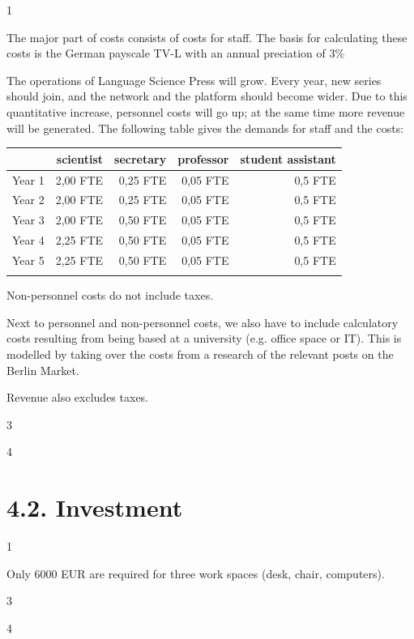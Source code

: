 \documentclass[output=guidelines,draftmode]{langscibook}
\newcommand{\background}[1]{ 
  \vspace{5mm}
  \renewcommand{\tblslinecolour}{lsDarkBlue}
  \tblssy[red]{explore2}{Background}{#1}
}
\newcommand{\langscisolution}[1]{
  \renewcommand{\tblslinecolour}{lsLightBlue}
  \tblssy{langsci}{LangSci solution}{#1}
}
\newcommand{\evaluation}[1]{
  \renewcommand{\tblslinecolour}{lsLightOrange}
  \tblssy{receipt}{Evaluation}{#1}
}
\newcommand{\othersolutions}[1]{
  \renewcommand{\tblslinecolour}{lsDarkGreenOne}
  \tblssy{more}{Other solutions}{#1}
}
\renewcommand{\tblssy}[4][black!12]{%
  \renewcommand{\langscisymbol}{#2}\renewcommand{\tblsboxcolor}{#1}
  \begin{mdframed}[style=yellowexercise,frametitle={#3}]
    #4
  \end{mdframed}
}
\begin{document}
\background{1}
\langscisolution{
The major part of costs consists of costs for staff. The basis for calculating these costs is the German payscale TV-L with an annual preciation of 3\%

The operations of Language Science Press will grow. Every year, new series should join, and the network and the platform should become wider. Due to this quantitative increase, personnel costs will go up; at the same time more revenue will be generated. The following table gives the demands for staff and the costs: 

\noindent
\begin{tabularx}{\textwidth}{Xrrrr}
\lsptoprule
         &  scientist  & secretary &   professor &   student assistant  \\
\midrule
Year 1 &  2,00 FTE                 &    0,25 FTE                       &   0,05 FTE    &   0,5 FTE                  \\
Year 2 &  2,00 FTE                 &    0,25 FTE                       &   0,05 FTE    &   0,5 FTE                  \\
Year 3 &  2,00 FTE                 &    0,50 FTE                        &   0,05 FTE    &   0,5 FTE                  \\
Year 4 &  2,25 FTE              &    0,50 FTE                        &   0,05 FTE    &   0,5 FTE                  \\
Year 5 &  2,25 FTE              &    0,50 FTE                        &   0,05 FTE    &   0,5 FTE                  \\
\lspbottomrule
\end{tabularx}

Non-personnel costs do not include taxes. 

Next to personnel and non-personnel costs, we also have to include calculatory costs resulting from being based at a university (e.g. office space or IT). This is modelled by taking over the costs from a research of the relevant posts on the Berlin Market. 

Revenue also excludes taxes. 
}
\evaluation{3}
\othersolutions{4}
  

\section{4.2. Investment}

\background{1}
\langscisolution{
Only 6000 EUR are required for three work spaces (desk, chair, computers). 
}
\evaluation{3}
\othersolutions{4}
 
\end{document}
